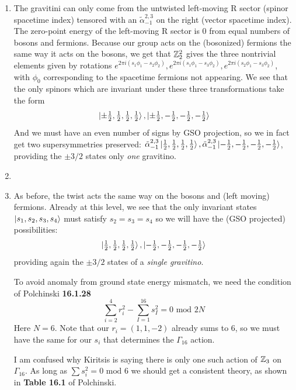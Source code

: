 \documentclass[11pt, class=article, crop=false]{standalone}
\begin{document}
\begin{enumerate}
	\item The gravitini can only come from the untwisted left-moving R sector (spinor spacetime index) tensored with an $\tilde \alpha^{2,3}_{-1}$ on the right (vector spacetime index). The zero-point energy of the left-moving R sector is $0$ from equal numbers of bosons and fermions. Because our group acts on the (bosonized) fermions the same way it acts on the bosons, we get that $\mathbb{Z}_2^2$ gives the three nontrivial elements given by rotations $e^{2 \pi i (s_1 \phi_1 - s_2 \phi_2)}, e^{2 \pi i (s_1 \phi_1 - s_3 \phi_2)}, e^{2 \pi i (s_2 \phi_1 - s_3 \phi_2)}$, with $\phi_0$ corresponding to the spacetime fermions not appearing. We see that the only spinors which are invariant under these three transformations take the form
	\[
		\ket{\pm \tfrac12, \tfrac12, \tfrac12, \tfrac12}, \ket{\pm \tfrac12, -\tfrac12, -\tfrac12, -\tfrac12}
	\]
	And we must have an even number of signs by GSO projection, so we in fact get two supersymmetries preserved: $\tilde \alpha^{2,3}_{-1} \ket{\frac12,\frac12,\frac12,\frac12}, \tilde \alpha^{2,3}_{-1} \ket{-\frac12,-\frac12,-\frac12,-\frac12}$, providing the $\pm 3/2$ states only \emph{one} gravitino. 
	
	\item 
	
	\item As before, the twist acts the same way on the bosons and (left moving) fermions. Already at this level, we see that the only invariant states $\ket{s_1, s_2, s_3, s_4}$ must satisfy $s_2 = s_3 = s_4$ so we will have the (GSO projected) possibilities:
	\[
		\ket{\tfrac12, \tfrac12, \tfrac12, \tfrac12}, \ket{-\tfrac12, -\tfrac12, -\tfrac12, -\tfrac12}
	\]
	providing again the $\pm 3/2$ states of a \emph{single gravitino}.
	
	To avoid anomaly from ground state energy mismatch, we need the condition of Polchinski \textbf{16.1.28}
	\[
		\sum_{i=2}^4 r_i^2 - \sum_{I=1}^{16} s_I^2 = 0 \text{ mod } 2N
	\]
	Here $N = 6$. Note that our $r_i = (1,1,-2)$ already sums to $6$, so we must have the same for our $s_i$ that determines the $\Gamma_{16}$ action. 
	
	I am confused why Kiritsis is saying there is only one such action of $\mathbb{Z}_3$ on $\Gamma_{16}$. As long as $\sum s_i^2= 0 \text{ mod } 6$ we should get a consistent theory, as shown in \textbf{Table 16.1} of Polchinski. 
	

\end{enumerate}
\end{document}
